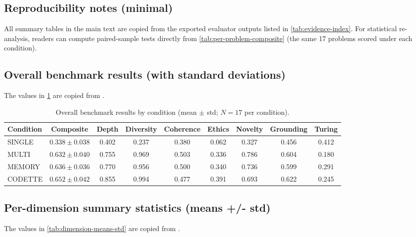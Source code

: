 \documentclass[11pt,a4paper]{article}
\begin{document}
\subsection{Reproducibility notes (minimal)}
\label{app:repro-notes}

All summary tables in the main text are copied from the exported evaluator outputs listed in \cref{tab:evidence-index}. For statistical re-analysis, readers can compute paired-sample tests directly from \cref{tab:per-problem-composite} (the same 17 problems scored under each condition).

\subsection{Overall benchmark results (with standard deviations)}
\label{app:overall-results}

The values in \cref{tab:overall-results-std} are copied from .

\begin{table}[ht]
\centering
\caption{Overall benchmark results by condition (mean $\pm$ std; $N=17$ per condition).}
\label{tab:overall-results-std}
\begin{tabular}{lcccccccc}
\toprule
\textbf{Condition} & \textbf{Composite} & \textbf{Depth} & \textbf{Diversity} & \textbf{Coherence} & \textbf{Ethics} & \textbf{Novelty} & \textbf{Grounding} & \textbf{Turing} \\
\midrule
SINGLE  & $0.338\pm0.038$ & 0.402 & 0.237 & 0.380 & 0.062 & 0.327 & 0.456 & 0.412 \\
MULTI   & $0.632\pm0.040$ & 0.755 & 0.969 & 0.503 & 0.336 & 0.786 & 0.604 & 0.180 \\
MEMORY  & $0.636\pm0.036$ & 0.770 & 0.956 & 0.500 & 0.340 & 0.736 & 0.599 & 0.291 \\
CODETTE & $0.652\pm0.042$ & 0.855 & 0.994 & 0.477 & 0.391 & 0.693 & 0.622 & 0.245 \\
\bottomrule
\end{tabular}
\end{table}

\subsection{Per-dimension summary statistics (means +/- std)}
\label{app:dimension-stats}

The values in \cref{tab:dimension-means-std} are copied from .
\end{document}
